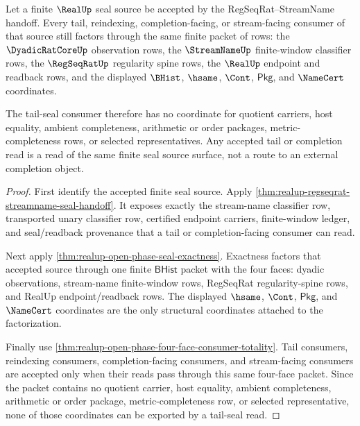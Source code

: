 \begin{theorem}
\label{thm:realup-regseqrat-streamname-tail-seal-nonescape}
Let a finite $\RealUp$ seal source be accepted by the RegSeqRat--StreamName
handoff. Every tail, reindexing, completion-facing, or stream-facing consumer
of that source still factors through the same finite packet of rows:
the $\DyadicRatCoreUp$ observation rows, the $\StreamNameUp$ finite-window
classifier rows, the $\RegSeqRatUp$ regularity spine rows, the $\RealUp$
endpoint and readback rows, and the displayed $\BHist$, $\hsame$, $\Cont$,
$\mathsf{Pkg}$, and $\NameCert$ coordinates.

The tail-seal consumer therefore has no coordinate for quotient carriers,
host equality, ambient completeness, arithmetic or order packages,
metric-completeness rows, or selected representatives. Any accepted tail or
completion read is a read of the same finite seal source surface, not a route
to an external completion object.
\end{theorem}
\begin{proof}
First identify the accepted finite seal source. Apply
\autoref{thm:realup-regseqrat-streamname-seal-handoff}. It exposes exactly the
stream-name classifier row, transported unary classifier row, certified
endpoint carriers, finite-window ledger, and seal/readback provenance that a
tail or completion-facing consumer can read.

Next apply \autoref{thm:realup-open-phase-seal-exactness}. Exactness factors
that accepted source through one finite $\mathsf{BHist}$ packet with the four
faces: dyadic observations, stream-name finite-window rows, RegSeqRat
regularity-spine rows, and RealUp endpoint/readback rows. The displayed
$\hsame$, $\Cont$, $\mathsf{Pkg}$, and $\NameCert$ coordinates are the only
structural coordinates attached to the factorization.

Finally use
\autoref{thm:realup-open-phase-four-face-consumer-totality}. Tail consumers,
reindexing consumers, completion-facing consumers, and stream-facing consumers
are accepted only when their reads pass through this same four-face packet.
Since the packet contains no quotient carrier, host equality, ambient
completeness, arithmetic or order package, metric-completeness row, or
selected representative, none of those coordinates can be exported by a
tail-seal read.
\end{proof}
